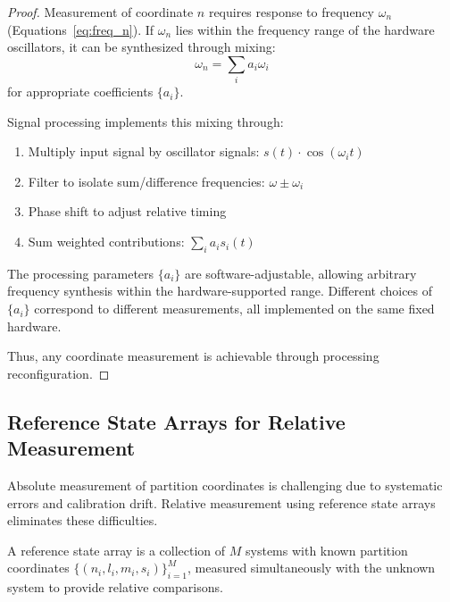 \begin{proof}
Measurement of coordinate $n$ requires response to frequency $\omega_n$ (Equations~\ref{eq:freq_n}). If $\omega_n$ lies within the frequency range of the hardware oscillators, it can be synthesized through mixing:
\begin{equation}
\omega_n = \sum_i a_i \omega_i
\end{equation}
for appropriate coefficients $\{a_i\}$.

Signal processing implements this mixing through:
\begin{enumerate}
\item Multiply input signal by oscillator signals: $s(t) \cdot \cos(\omega_i t)$
\item Filter to isolate sum/difference frequencies: $\omega \pm \omega_i$
\item Phase shift to adjust relative timing
\item Sum weighted contributions: $\sum_i a_i s_i(t)$
\end{enumerate}

The processing parameters $\{a_i\}$ are software-adjustable, allowing arbitrary frequency synthesis within the hardware-supported range. Different choices of $\{a_i\}$ correspond to different measurements, all implemented on the same fixed hardware.

Thus, any coordinate measurement is achievable through processing reconfiguration.
\end{proof}

\subsection{Reference State Arrays for Relative Measurement}

Absolute measurement of partition coordinates is challenging due to systematic errors and calibration drift. Relative measurement using reference state arrays eliminates these difficulties.

\begin{definition}
\label{def:reference_array}
A reference state array is a collection of $M$ systems with known partition coordinates $\{(n_i, l_i, m_i, s_i)\}_{i=1}^{M}$, measured simultaneously with the unknown system to provide relative comparisons.
\end{definition}

